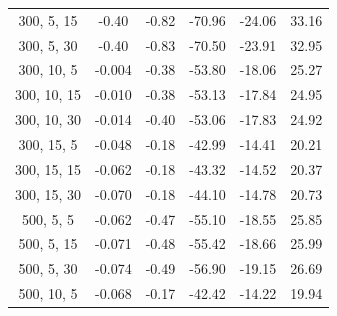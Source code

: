 \documentclass{article}
\begin{document}
\begin{table}[H]
{\begin{tabular}{|c|c|c|c|c|c|}
                300, 5, 15                 & -0.40                      & -0.82                      & -70.96                     & -24.06                   & 33.16                   \\
                300, 5, 30                 & -0.40                      & -0.83                      & -70.50                     & -23.91                   & 32.95                   \\
                300, 10, 5                 & -0.004                     & -0.38                      & -53.80                     & -18.06                   & 25.27                   \\
                300, 10, 15                & -0.010                     & -0.38                      & -53.13                     & -17.84                   & 24.95                   \\
                300, 10, 30                & -0.014                     & -0.40                      & -53.06                     & -17.83                   & 24.92                   \\
                300, 15, 5                 & -0.048                     & -0.18                      & -42.99                     & -14.41                   & 20.21                   \\
                300, 15, 15                & -0.062                     & -0.18                      & -43.32                     & -14.52                   & 20.37                   \\
                300, 15, 30                & -0.070                     & -0.18                      & -44.10                     & -14.78                   & 20.73                   \\
                500, 5, 5                  & -0.062                     & -0.47                      & -55.10                     & -18.55                   & 25.85                   \\
                500, 5, 15                 & -0.071                     & -0.48                      & -55.42                     & -18.66                   & 25.99                   \\
                500, 5, 30                 & -0.074                     & -0.49                      & -56.90                     & -19.15                   & 26.69                   \\
                500, 10, 5                 & -0.068                     & -0.17                      & -42.42                     & -14.22                   & 19.94                   \\

\end{tabular}}
\end{table}
\end{document}
